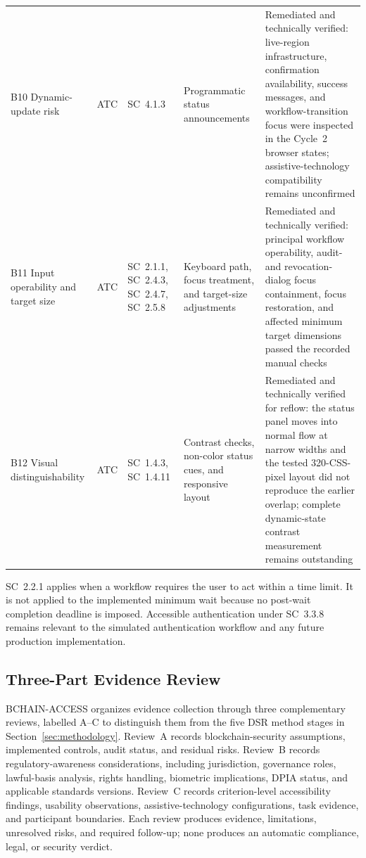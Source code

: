 \documentclass[journal]{IEEEtran}
\begin{document}
\begin{table}[!t]
\begin{tabularx}{\textwidth}{p{}p{}p{}X p{}}
B10 Dynamic-update risk & ATC & SC~4.1.3 & Programmatic status announcements & Remediated and technically verified: live-region infrastructure, confirmation availability, success messages, and workflow-transition focus were inspected in the Cycle~2 browser states; assistive-technology compatibility remains unconfirmed \\
B11 Input operability and target size & ATC & SC~2.1.1, SC~2.4.3, SC~2.4.7, SC~2.5.8 & Keyboard path, focus treatment, and target-size adjustments & Remediated and technically verified: principal workflow operability, audit- and revocation-dialog focus containment, focus restoration, and affected minimum target dimensions passed the recorded manual checks \\
B12 Visual distinguishability & ATC & SC~1.4.3, SC~1.4.11 & Contrast checks, non-color status cues, and responsive layout & Remediated and technically verified for reflow: the status panel moves into normal flow at narrow widths and the tested 320-CSS-pixel layout did not reproduce the earlier overlap; complete dynamic-state contrast measurement remains outstanding \\
\bottomrule
\end{tabularx}
\end{table}

SC~2.2.1 applies when a workflow requires the user to act within a time limit. It is not applied to the implemented minimum wait because no post-wait completion deadline is imposed. Accessible authentication under SC~3.3.8 remains relevant to the simulated authentication workflow and any future production implementation.

\subsection{Three-Part Evidence Review}

BCHAIN-ACCESS organizes evidence collection through three complementary reviews, labelled A--C to distinguish them from the five DSR method stages in Section~\ref{sec:methodology}. Review~A records blockchain-security assumptions, implemented controls, audit status, and residual risks. Review~B records regulatory-awareness considerations, including jurisdiction, governance roles, lawful-basis analysis, rights handling, biometric implications, DPIA status, and applicable standards versions. Review~C records criterion-level accessibility findings, usability observations, assistive-technology configurations, task evidence, and participant boundaries. Each review produces evidence, limitations, unresolved risks, and required follow-up; none produces an automatic compliance, legal, or security verdict.
\end{document}
